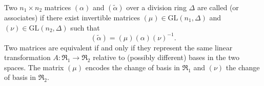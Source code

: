 Two $n_1 \times n_2$ matrices $(\alpha)$ and $(\tilde{\alpha})$ over a division ring $\Delta$ are called  (or associates) if there exist invertible matrices $(\mu) \in \mathrm{GL}(n_1, \Delta)$ and $(\nu) \in \mathrm{GL}(n_2, \Delta)$ such that
$$(\tilde{\alpha}) = (\mu)(\alpha)(\nu)^{-1}.$$
Two matrices are equivalent if and only if they represent the same linear transformation $A: \mathfrak{R}_1 \to \mathfrak{R}_2$ relative to (possibly different) bases in the two spaces. The matrix $(\mu)$ encodes the change of basis in $\mathfrak{R}_1$ and $(\nu)$ the change of basis in $\mathfrak{R}_2$.
